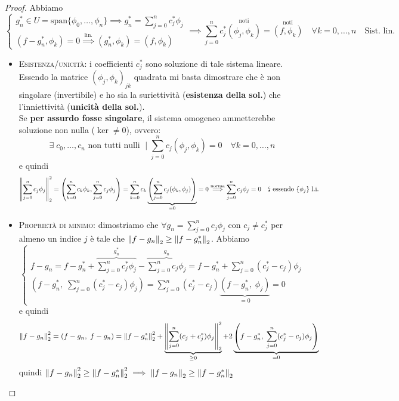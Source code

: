 \documentclass[a4paper,10pt]{article}
\theoremstyle{definition}
\newcommand{\noun}[1]{\textsc{#1}}
\theoremstyle{indentdefinition}
\theoremstyle{indenttheorem}
\theoremstyle{myremark}
\theoremstyle{indentgeneral}
\theoremstyle{plain}
\theoremstyle{plain}
\begin{document}
\begin{proof}
    Abbiamo
    $$\begin{cases}
        g^*_n\in U=\text{span}\{\phi_0,\ldots,\phi_n\}\implies  g^*_n=\sum_{j=0}^n c^*_j\phi_j \\
        (f- g^*_n,\phi_k)=0\overset{\text{lin.}}{\implies} (g^*_n,\phi_k)=(f,\phi_k)
    \end{cases}\implies \sum_{j=0}^nc^*_j\overset{\text{noti}}{(\phi_j,\phi_k)}=\overset{\text{noti}}{(f,\phi_k)}\quad \forall k=0,\dots, n \quad \text{Sist. lin.}$$
    \begin{itemize}
        \item \noun{Esistenza/unicità}: i coefficienti $c^*_j$ sono soluzione di tale sistema lineare. Essendo la matrice $(\phi_j,\phi_k)_{jk}$ quadrata mi basta dimostrare che è non singolare (invertibile) e ho sia la suriettività (\textbf{esistenza della sol.}) che l'inniettività (\textbf{unicità della sol.}).\\
    Se \textbf{per assurdo fosse singolare}, il sistema omogeneo ammetterebbe soluzione non nulla ($\ker\ne0$), ovvero:
    $$\exists \;c_0,\dots,c_n\text{ non tutti nulli }\mid \sum_{j=0}^nc_j(\phi_j,\phi_k)=0 \quad \forall k=0,\dots, n$$
    e quindi
    \begin{align*}
\norm{\sum_{j=0}^nc_j\phi_j}_2^2=\left(\sum_{k=0}^nc_k\phi_k,\sum_{j=0}^nc_j\phi_j\right)=\sum_{k=0}^nc_k\underbrace{\left(\sum_{j=0}^nc_j(\phi_k,\phi_j)\right)}_{=0}=0\overset{\text{norma}}{\implies}\sum_{j=0}^nc_j\phi_j=0 \quad\text{\lightning}
\text{ essendo $\{\phi_j\}$ l.i.}
    \end{align*}
    \item \noun{Proprietà di minimo}: dimostriamo che $\forall g_n=\sum_{j=0}^nc_j\phi_j$ con $c_j\ne c_j^*$ per almeno un indice $j$ è tale che $\norm{f-g_n}_2\ge\norm{f-g_n^*}_2$. Abbiamo
    $$\begin{cases}
        f-g_n=f-g_n^*+\overbrace{\sum_{j=0}^nc_j^*\phi_j}^{g_n^*}-\overbrace{\sum_{j=0}^nc_j\phi_j}^{g_n}=f-g_n^*+\sum_{j=0}^n(c_j^*-c_j)\phi_j \\
        (f-g_n^*, \; \sum_{j=0}^n(c_j^*-c_j)\phi_j)=\sum_{j=0}^n(c_j^*-c_j)\underbrace{(f-g_n^*, \; \phi_j)}_{=0}=0
    \end{cases}$$
    e quindi
    $$\norm{f-g_n}_2^2=(f-g_n,\;f-g_n)=\norm{f-g^*_n}_2^2+\underbrace{\norm{\sum_{j=0}^n(c_j+c_j^*)\phi_j}_2^2}_{\ge 0}+2 \underbrace{\left(f-g_n^*, \; \sum_{j=0}^n(c_j^*-c_j)\phi_j\right)}_{=0}$$
    quindi $\norm{f-g_n}_2^2\ge\norm{f-g^*_n}_2^2\implies \norm{f-g_n}_2\ge\norm{f-g^*_n}_2$
    \end{itemize}
\end{proof}
\end{document}

